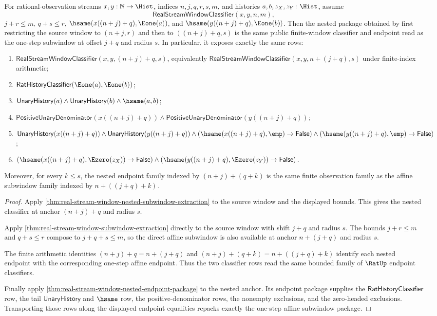 \begin{theorem}
\label{thm:real-stream-window-affine-subwindow-collapse}
For rational-observation streams $x,y:\mathbb{N}\to\Hist$, indices
$n,j,q,r,s,m$, and histories $a,b,z_X,z_Y:\Hist$, assume
$$
\mathsf{RealStreamWindowClassifier}(x,y,n,m),
$$
$j+r\le m$, $q+s\le r$, $\hsame(x((n+j)+q),\Eone(a))$, and
$\hsame(y((n+j)+q),\Eone(b))$. Then the nested package obtained by first
restricting the source window to $(n+j,r)$ and then to $((n+j)+q,s)$ is the
same public finite-window classifier and endpoint read as the one-step
subwindow at offset $j+q$ and radius $s$. In particular, it exposes exactly
the same rows:
\begin{enumerate}
\item $\mathsf{RealStreamWindowClassifier}(x,y,(n+j)+q,s)$, equivalently
$\mathsf{RealStreamWindowClassifier}(x,y,n+(j+q),s)$ under finite-index
arithmetic;
\item $\mathsf{RatHistoryClassifier}(\Eone(a),\Eone(b))$;
\item $\mathsf{UnaryHistory}(a)\land\mathsf{UnaryHistory}(b)\land
\hsame(a,b)$;
\item $\mathsf{PositiveUnaryDenominator}(x((n+j)+q))\land
\mathsf{PositiveUnaryDenominator}(y((n+j)+q))$;
\item $\mathsf{UnaryHistory}(x((n+j)+q))\land
\mathsf{UnaryHistory}(y((n+j)+q))\land
(\hsame(x((n+j)+q),\emp)\to\mathsf{False})\land
(\hsame(y((n+j)+q),\emp)\to\mathsf{False})$;
\item $(\hsame(x((n+j)+q),\Ezero(z_X))\to\mathsf{False})\land
(\hsame(y((n+j)+q),\Ezero(z_Y))\to\mathsf{False})$.
\end{enumerate}
Moreover, for every $k\le s$, the nested endpoint family indexed by
$(n+j)+(q+k)$ is the same finite observation family as the affine subwindow
family indexed by $n+((j+q)+k)$.
\end{theorem}
\begin{proof}
Apply \autoref{thm:real-stream-window-nested-subwindow-extraction} to the
source window and the displayed bounds. This gives the nested classifier at
anchor $(n+j)+q$ and radius $s$.

Apply \autoref{thm:real-stream-window-subwindow-extraction} directly to the
source window with shift $j+q$ and radius $s$. The bounds $j+r\le m$ and
$q+s\le r$ compose to $j+q+s\le m$, so the direct affine subwindow is also
available at anchor $n+(j+q)$ and radius $s$.

The finite arithmetic identities $(n+j)+q=n+(j+q)$ and
$(n+j)+(q+k)=n+((j+q)+k)$ identify each nested endpoint with the corresponding
one-step affine endpoint. Thus the two classifier rows read the same bounded
family of $\RatUp$ endpoint classifiers.

Finally apply \autoref{thm:real-stream-window-nested-endpoint-package} to the
nested anchor. Its endpoint package supplies the
$\mathsf{RatHistoryClassifier}$ row, the tail $\mathsf{UnaryHistory}$ and
$\hsame$ row, the positive-denominator rows, the nonempty exclusions, and the
zero-headed exclusions. Transporting those rows along the displayed endpoint
equalities repacks exactly the one-step affine subwindow package.
\end{proof}

